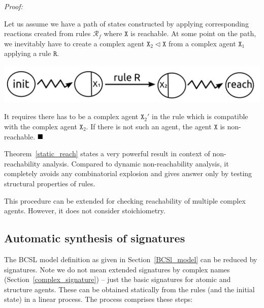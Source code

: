 \documentclass[12pt, twoside]{fithesis2} %
\newenvironment{proof}{\noindent\emph{Proof:~ }\nopagebreak \begin{itshape}}{\end{itshape}\bigskip}
\newcommand*{\QEDA}{\hfill\ensuremath{\blacksquare}}%
\begin{document}
\begin{proof}
Let us assume we have a path of states constructed by applying corresponding reactions created from rules $\mathcal{R}_f$ where $\mathtt{X}$ is reachable. At some point on the path, we inevitably have to create a complex agent $\mathtt{X}_2 \lhd \mathtt{X}$ from a complex agent $\mathtt{X}_1$ applying a rule $\mathtt{R}$. 

\begin{center}
\includegraphics[scale=0.15]{pics/static_reach}
\end{center}

It requires there has to be a complex agent $\mathtt{X}_2'$ in the rule which is compatible with the complex agent $\mathtt{X}_2$. If there is not such an agent, the agent $\mathtt{X}$ is non-reachable. $\QEDA$
\end{proof}

Theorem~\ref{static_reach} states a very powerful result in context of non-reachability analysis. Compared to dynamic non-reachability analysis, it completely avoids any combinatorial explosion and gives answer only by testing structural properties of rules.

This procedure can be extended for checking reachability of multiple complex agents. However, it does not consider stoichiometry.

\subsection{Automatic synthesis of signatures}

The BCSL model definition as given in Section~\ref{BCSl_model} can be reduced by signatures. Note we do not mean extended signatures by complex names (Section~\ref{complex_signature}) -- just the basic signatures for atomic and structure agents. These can be obtained statically from the rules (and the initial state) in a  linear process. The process comprises these steps:
\end{document}
